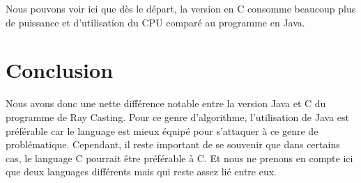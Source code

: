 \documentclass[12pt, a4paper]{report}
\begin{document}
Nous pouvons voir ici que dès le départ, la version en C consomme beaucoup plus de puissance et d'utilisation du CPU comparé au programme en Java.

\chapter{\centering Conclusion}
Nous avons donc une nette différence notable entre la version Java et C du programme de Ray Casting. Pour ce genre d'algorithme, l'utilisation de Java est préférable car le language est mieux équipé pour s'attaquer à ce genre de problématique.
Cependant, il reste important de se souvenir que dans certains cas, le language C pourrait être préférable à C. Et nous ne prenons en compte ici que deux languages différents mais qui reste assez lié entre eux.



\printglossary
\end{document}
